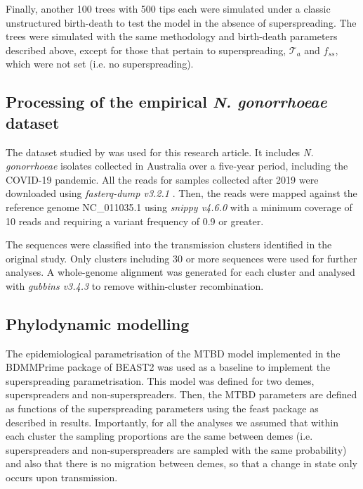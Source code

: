 \documentclass[lineno,pdflatex,sn-nature]{sn-jnl}%
\theoremstyle{thmstyleone}%
\theoremstyle{thmstyletwo}%
\theoremstyle{thmstylethree}%
\begin{document}
Finally, another 100 trees with 500 tips each were simulated under a classic unstructured birth-death to test the model in the absence of superspreading. The trees were simulated with the same methodology and birth-death parameters described above, except for those that pertain to superspreading, $\mathcal{T}_a$ and $f_{ss}$, which were not set (i.e. no superspreading). 

\subsection{Processing of the empirical \textit{N. gonorrhoeae} dataset}

The dataset studied by \cite{Taouk2024longitudinal} was used for this research article. It includes \textit{N. gonorrhoeae} isolates collected in Australia over a five-year period, including the COVID-19 pandemic. All the reads for samples collected after 2019 were downloaded using \textit{fasterq-dump v3.2.1} \cite{Wheeler2006sratools}. Then, the reads were mapped against the reference genome NC\_011035.1 \cite{Gyung2008complete} using \textit{snippy v4.6.0} \cite{seemann2015snippy} with a minimum coverage of 10 reads and requiring a variant frequency of 0.9 or greater. \newline

The sequences were classified into the transmission clusters identified in the original study. Only clusters including 30 or more sequences were used for further analyses. A whole-genome alignment was generated for each cluster and analysed with \textit{gubbins v3.4.3} \cite{Croucher2015gubbins} to remove within-cluster recombination.

\subsection{Phylodynamic modelling}

The epidemiological parametrisation of the MTBD model implemented in the BDMMPrime package of BEAST2 \cite{RefWorks:bouckaert2014beast, vaughan2025bayesian} was used as a baseline to implement the superspreading parametrisation. This model was defined for two demes, superspreaders and non-superspreaders. Then, the MTBD parameters are defined as functions of the superspreading parameters using the feast package \cite{tim2026feast} as described in results. Importantly, for all the analyses we assumed that within each cluster the sampling proportions are the same between demes (i.e. superspreaders and non-superspreaders are sampled with the same probability) and also that there is no migration between demes, so that a change in state only occurs upon transmission.\newline
\end{document}
